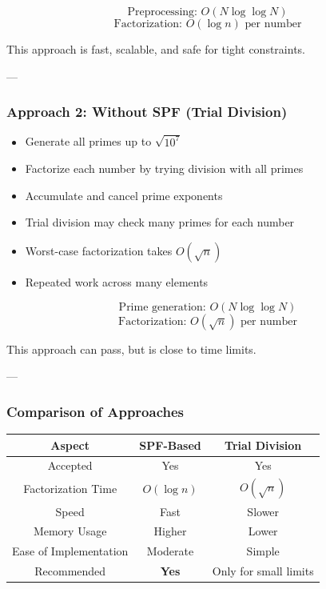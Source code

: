 \documentclass[11pt]{article}
\begin{document}

\[
\text{Preprocessing: } O(N \log \log N)
\]
\[
\text{Factorization: } O(\log n) \text{ per number}
\]

This approach is fast, scalable, and safe for tight constraints.

---

\subsubsection{Approach 2: Without SPF (Trial Division)}


\begin{itemize}
    \item Generate all primes up to $\sqrt{10^7}$
    \item Factorize each number by trying division with all primes
    \item Accumulate and cancel prime exponents
\end{itemize}


\begin{itemize}
    \item Trial division may check many primes for each number
    \item Worst-case factorization takes $O(\sqrt{n})$
    \item Repeated work across many elements
\end{itemize}


\[
\text{Prime generation: } O(N \log \log N)
\]
\[
\text{Factorization: } O(\sqrt{n}) \text{ per number}
\]

This approach can pass, but is close to time limits.

---

\subsubsection{Comparison of Approaches}

\begin{center}
\begin{tabular}{|c|c|c|}
\hline
\textbf{Aspect} & \textbf{SPF-Based} & \textbf{Trial Division} \\
\hline
Accepted & Yes & Yes \\
\hline
Factorization Time & $O(\log n)$ & $O(\sqrt{n})$ \\
\hline
Speed & Fast & Slower \\
\hline
Memory Usage & Higher & Lower \\
\hline
Ease of Implementation & Moderate & Simple \\
\hline
Recommended & \textbf{Yes} & Only for small limits \\
\hline
\end{tabular}
\end{center}
\end{document}
